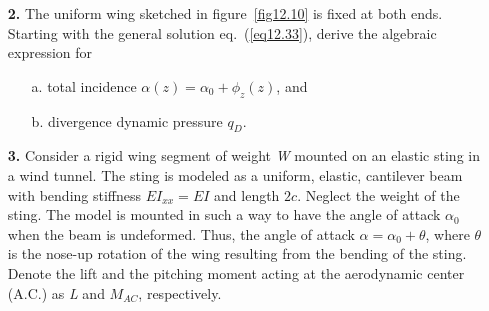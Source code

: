 \documentclass{AeroStructure-ERJohnson}
\begin{document}
\begin{exercise}
\begin{enumerate}[\textbf{2.}]
\item[\textbf{2.}] The uniform wing sketched in figure~\ref{fig12.10} is fixed at both ends. Starting with the general solution eq.~(\ref{eq12.33}), derive the algebraic expression for
\begin{enumerate}[b.]
  \item[{\hskip13pt}a.] total incidence $\alpha(z)=\alpha_{0}+\phi_{z}(z)$, and
  \item[{\hskip13pt}b.] divergence dynamic pressure $q_{D}$\vspace*{-10pt}.
  {\def\thefigure{12.10}

}
\end{enumerate}



\item[\textbf{3.}] Consider a rigid wing segment of weight \textit{W} mounted on an elastic sting in a wind tunnel. The sting is modeled as a uniform, elastic, cantilever beam with bending stiffness $E I_{x x}=E I$ and length $2c$. Neglect the weight of the sting. The model is mounted in such a way to have the angle of attack $\alpha_{0}$ when the beam is undeformed. Thus, the angle of attack $\alpha=\alpha_{0}+\theta$, where $\theta$ is the nose-up rotation of the wing resulting from the bending of the sting. Denote the lift and the pitching moment acting at the aerodynamic center (A.C.) as \textit{L} and $M_{A C}$, respectively.

    {\def\thefigure{12.11}
}



\end{enumerate}
\end{exercise}
\end{document}
